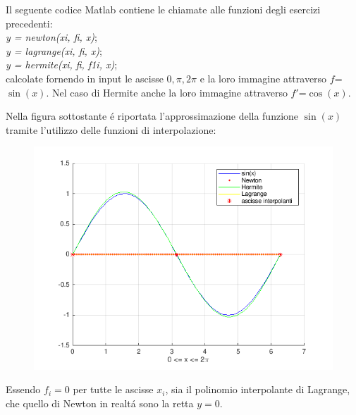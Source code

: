 \begin{center}
\large\noindent{}\end{center}

\noindent Il seguente codice Matlab contiene le chiamate alle funzioni degli esercizi precedenti: \\ \textit{y = newton(xi, fi, x)}; \\ \textit{y = lagrange(xi, fi, x)}; \\ \textit{y = hermite(xi, fi, f1i, x)}; \\ 
calcolate fornendo in input le ascisse \(0, \pi, 2\pi \) e la loro immagine attraverso \(f\)=\(\sin(x)\). Nel caso di Hermite anche la loro immagine attraverso \(f'\)=\(\cos(x)\).



\pagebreak
\noindent Nella figura sottostante \'e riportata l'approssimazione della funzione \(\sin(x)\) tramite l'utilizzo delle funzioni di interpolazione:\\

\begin{figure}[H]
	\centering
	\label{Cap4_Es_4}
	\includegraphics[width=\textwidth,height=\textheight,keepaspectratio]{Codici/Cap4/es4_cap4.png}
\end{figure}

\noindent Essendo \(f_i=0\) per tutte le ascisse \(x_i\), sia il polinomio interpolante di Lagrange, che quello di Newton in realt\'a sono la retta \(y=0\). \\ \\